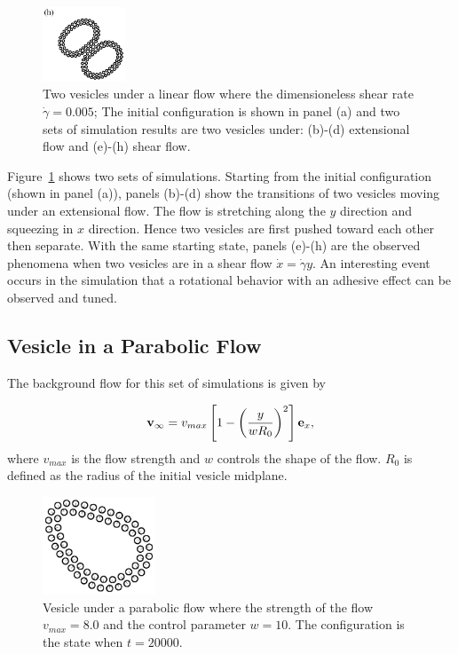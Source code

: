 \documentclass[lineno]{jfm}
\begin{document}
\begin{figure}
\begin{center}
\includegraphics[width=0.22\textwidth]{N116_shear_12000.eps}
\end{center}
  \caption{Two vesicles under a linear flow where the dimensioneless shear rate $\dot\gamma=0.005$; The initial configuration is shown in panel (a) and two sets of simulation results are two vesicles under: 
  (b)-(d) extensional flow and (e)-(h) shear flow. 
  }
    \label{figure5}
\end{figure}


Figure~\ref{figure5} shows two sets of simulations. Starting from the initial configuration (shown in panel (a)), panels (b)-(d) show the transitions of two vesicles moving under an extensional flow. The flow is stretching along the $y$ direction and squeezing in $x$ direction. Hence two vesicles are first pushed toward each other  then separate. With the same starting state, panels (e)-(h) are the observed phenomena when two vesicles are in a shear flow $\dot x = \dot\gamma y$. An interesting event occurs in the simulation that a rotational behavior with an adhesive effect can be observed and tuned.




\subsection{Vesicle in a Parabolic Flow}

The background flow for this set of simulations is given by

\begin{equation}
{\bf v}_\infty = v_{max}\left[ 1 - \left( \frac{y}{wR_0}\right)^2 \right]{\bf e}_x,
\end{equation}
%
where $v_{max}$ is the flow strength and $w$ controls the shape of the flow. $R_0$ is defined as the radius of the initial vesicle midplane.

\begin{figure}
\begin{center}
\includegraphics[width=0.3\textwidth]{N58_parabolic.eps}
\end{center}
  \caption{Vesicle under a parabolic flow where the strength of the flow $v_{max}=8.0$ and the control parameter $w=10$. The configuration is the state when $t=20000$.
  }
    \label{figure6}
\end{figure}
\end{document}
